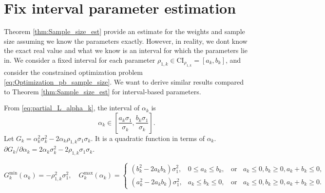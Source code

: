 \section{Fix interval parameter estimation}\label{sec:Fix_interval_parameter_est}
Theorem \eqref{thm:Sample_size_est} provide an estimate for the weights and sample size assuming we know the parameters exactly. However, in reality, we dont know the exact real value and what we know is an interval for which the parameters lie in. We consider a fixed interval for each parameter $\rho_{1,k}\in \text{CI}_{\rho_{1,k}}=[a_k,b_k]$, and consider the constrained optimization problem \eqref{eq:Optimization_pb_sample_size}. We want to derive similar results compared to Theorem \eqref{thm:Sample_size_est} for interval-based parameters.

From \eqref{eq:partial_L_alpha_k}, the interval of $\alpha_k$ is 
\[
\alpha_k\in \left[\frac{a_k\sigma_1}{\sigma_k}, \frac{b_k\sigma_1}{\sigma_k}\right].
\]
Let $G_k =\alpha_k^2\sigma_k^2-2\alpha_k\rho_{1,k}\sigma_1\sigma_k$. It is a quadratic function in terms of $\alpha_k$. $\partial G_k/\partial \alpha_k = 2\alpha_k\sigma_k^2 - 2\rho_{1,k}\sigma_1\sigma_k$.


\[
G_k^{\text{min}}(\alpha_k) = -\rho_{1,k}^2\sigma_1^2,\quad
G_k^{\text{max}}(\alpha_k) =\left\{\begin{array}{ll}
\left(b_k^2-2a_kb_k\right)\sigma_1^2, & 0\le a_k\le b_k,\;\; \text{ or } \;\;a_k\le 0, b_k\ge 0, a_k+b_k\le 0,\\
\left(a_k^2-2a_kb_k\right)\sigma_1^2, &a_k\le b_k\le 0,\;\; \text{ or } \;\;a_k\le 0, b_k\ge 0, a_k+b_k\ge 0.
\end{array}
\right.
\]

